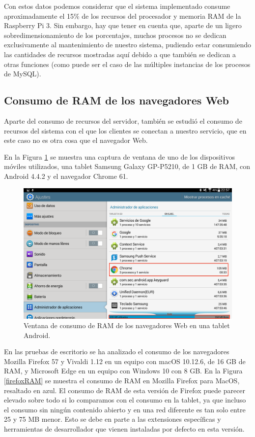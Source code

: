 Con estos datos podemos considerar que el sistema implementado consume aproximadamente el 15\% de los recursos del procesador y memoria RAM de la Raspberry Pi 3. Sin embargo, hay que tener en cuenta que, aparte de un ligero sobredimensionamiento de los porcentajes, muchos procesos no se dedican exclusivamente al mantenimiento de nuestro sistema, pudiendo estar consumiendo las cantidades de recursos mostradas aquí debido a que también se dedican a otras funciones (como puede ser el caso de las múltiples instancias de los procesos de MySQL).


\subsection{Consumo de RAM de los navegadores Web}

Aparte del consumo de recursos del servidor, también se estudió el consumo de recursos del sistema con el que los clientes se conectan a nuestro servicio, que en este caso no es otra cosa que el navegador Web.

En la Figura \ref{tabletChrome} se muestra una captura de ventana de uno de los dispositivos móviles utilizados, una tablet Samsung Galaxy GP-P5210, de 1 GB de RAM, con Android 4.4.2 y el navegador Chrome 61.

\begin{figure}[!t]
\begin{center}
\includegraphics[width=0.75\linewidth]{./6_EvalEmpirica/Img/tabletChrome.png}
\end{center}
\caption{Ventana de consumo de RAM de los navegadores Web en una tablet Android.}
\label{tabletChrome}
\end{figure}

En las pruebas de escritorio se ha analizado el consumo de los navegadores Mozilla Firefox 57 y Vivaldi 1.12 en un equipo con macOS 10.12.6, de 16 GB de RAM, y Microsoft Edge en un equipo con Windows 10 con 8 GB. En la Figura \ref{firefoxRAM} se muestra el consumo de RAM en Mozilla Firefox para MacOS, resaltado en azul. El consumo de RAM de esta versión de Firefox puede parecer elevado sobre todo si lo comparamos con el consumo en la tablet, ya que incluso el consumo sin ningún contenido abierto y en una red diferente es tan solo entre 25 y 75 MB menor. Esto se debe en parte a las extensiones específicas y herramientas de desarrollador que vienen instaladas por defecto en esta versión.

